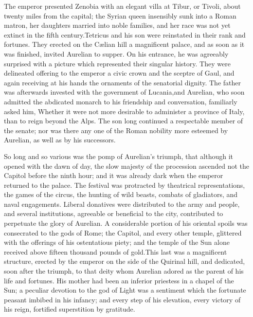 The emperor presented Zenobia with an elegant villa at Tibur, or
Tivoli, about twenty miles from the capital; the Syrian queen
insensibly sunk into a Roman matron, her daughters married into
noble families, and her race was not yet extinct in the fifth
century.\footnotemark[82] Tetricus and his son were reinstated in their rank
and fortunes. They erected on the Cælian hill a magnificent
palace, and as soon as it was finished, invited Aurelian to
supper. On his entrance, he was agreeably surprised with a
picture which represented their singular history. They were
delineated offering to the emperor a civic crown and the sceptre
of Gaul, and again receiving at his hands the ornaments of the
senatorial dignity. The father was afterwards invested with the
government of Lucania,\footnotemark[83] and Aurelian, who soon admitted the
abdicated monarch to his friendship and conversation, familiarly
asked him, Whether it were not more desirable to administer a
province of Italy, than to reign beyond the Alps. The son long
continued a respectable member of the senate; nor was there any
one of the Roman nobility more esteemed by Aurelian, as well as
by his successors.\footnotemark[84]




So long and so various was the pomp of Aurelian’s triumph, that
although it opened with the dawn of day, the slow majesty of the
procession ascended not the Capitol before the ninth hour; and it
was already dark when the emperor returned to the palace. The
festival was protracted by theatrical representations, the games
of the circus, the hunting of wild beasts, combats of gladiators,
and naval engagements. Liberal donatives were distributed to the
army and people, and several institutions, agreeable or
beneficial to the city, contributed to perpetuate the glory of
Aurelian. A considerable portion of his oriental spoils was
consecrated to the gods of Rome; the Capitol, and every other
temple, glittered with the offerings of his ostentatious piety;
and the temple of the Sun alone received above fifteen thousand
pounds of gold.\footnotemark[85] This last was a magnificent structure, erected
by the emperor on the side of the Quirinal hill, and dedicated,
soon after the triumph, to that deity whom Aurelian adored as the
parent of his life and fortunes. His mother had been an inferior
priestess in a chapel of the Sun; a peculiar devotion to the god
of Light was a sentiment which the fortunate peasant imbibed in
his infancy; and every step of his elevation, every victory of
his reign, fortified superstition by gratitude.\footnotemark[86]

